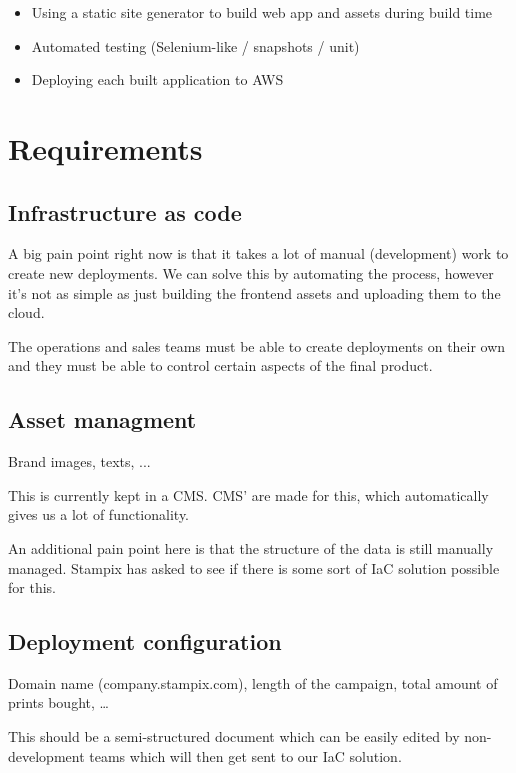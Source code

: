 \begin{itemize}
	\item Using a static site generator to build web app and assets during build time
	\item Automated testing (Selenium-like / snapshots / unit)
	\item Deploying each built application to AWS
\end{itemize}

\section{Requirements}

\subsection{Infrastructure as code}

A big pain point right now is that it takes a lot of manual (development) work to create new deployments.
We can solve this by automating the process, however it's not as simple as just building the frontend assets and uploading them to the cloud.

The operations and sales teams must be able to create deployments on their own and they must be able to control certain aspects of the final product.


\subsection{Asset managment}

Brand images, texts, ...

This is currently kept in a CMS. CMS' are made for this, which automatically gives us a lot of functionality. 

An additional pain point here is that the structure of the data is still manually managed. Stampix has asked to see if there is some sort of IaC solution possible for this.

\subsection{Deployment configuration}

Domain name (company.stampix.com), length of the campaign, total amount of prints bought, \dots

This should be a semi-structured document which can be easily edited by non-development teams which will then get sent to our IaC solution.

